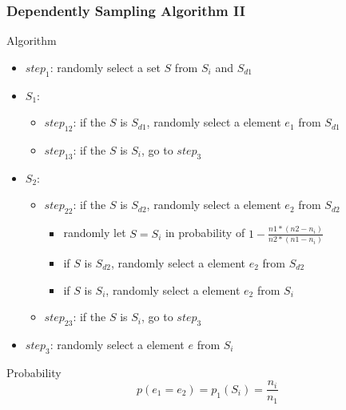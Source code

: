\documentclass[notheorems, aspectratio=54]{beamer}
\begin{document}
\begin{frame}
    \frametitle{Dependently Sampling Algorithm II}
    \begin{block}{Algorithm}
        \begin{itemize}
            \item $step_{1}$: randomly select a set $S$ from $S_i$ and $S_{d1}$
            \item $S_1$:
            \begin{itemize}
                \item $step_{12}$: if the $S$ is $S_{d1}$, randomly select a element $e_1$ from $S_{d1}$
                \item $step_{13}$: if the $S$ is $S_i$, go to $step_{3}$
            \end{itemize}
            \item $S_2$:
            \begin{itemize}
                \item $step_{22}$: if the $S$ is $S_{d2}$, randomly select a element $e_2$ from $S_{d2}$
                \begin{itemize}
                    \item randomly let $S = S_{i}$ in probability of $1-\frac{n1*(n2-n_i)}{n2*(n1-n_i)}$
                    \item if $S$ is $S_{d2}$, randomly select a element $e_2$ from $S_{d2}$
                    \item if $S$ is $S_i$, randomly select a element $e_2$ from $S_{i}$
                \end{itemize}
                \item $step_{23}$: if the $S$ is $S_i$, go to $step_3$
            \end{itemize}
            \item $step_{3}$: randomly select a element $e$ from $S_i$
        \end{itemize}
    \end{block}
    \begin{block}{Probability}
        $$
            p(e_1 = e_2) = p_1(S_i) = \frac{n_i}{n_1}
        $$
    \end{block}
\end{frame}
\end{document}
